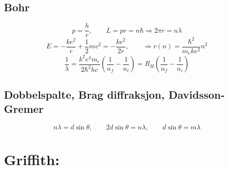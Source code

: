 \documentclass[a4paper,norsk, 10pt]{article}
\begin{document}
\subsection{Bohr}
\begin{equation}
p = \frac{h}{r},\qquad L = pr = n\hbar \Rightarrow 2\pi r = n\lambda
\end{equation}
\begin{equation}
E = -\frac{ke^2}{r} + \frac{1}{2}mv^2 = -\frac{ke^2}{2r}, \qquad \Rightarrow r(n) = \frac{\hbar^2}{m_eke^2}n^2
\end{equation}
\begin{equation}
\frac{1}{\lambda} = \frac{k^2e^4m_e}{2\hbar^2 hc}\left(\frac{1}{n_f} - \frac{1}{n_i}\right) = R_H\left(\frac{1}{n_f} - \frac{1}{n_i}\right)
\end{equation}

\subsection{Dobbelspalte, Brag diffraksjon, Davidsson-Gremer}

\begin{equation}
n\lambda = d\sin\theta,\qquad 2d\sin\theta = n\lambda,\qquad d\sin\theta=m\lambda
\end{equation}

\section{Griffith:}
\end{document}
